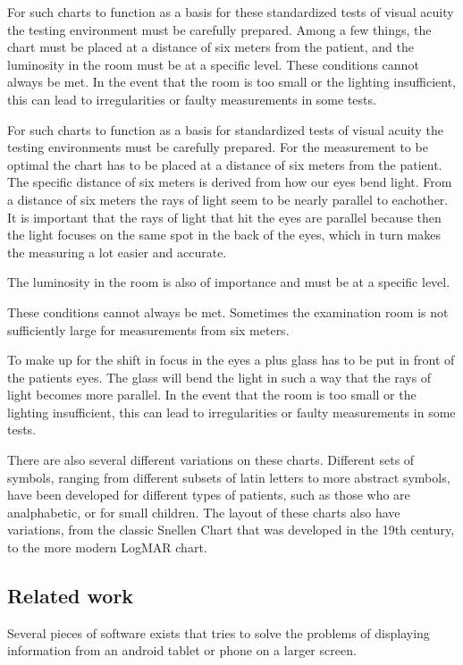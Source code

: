 \documentclass[12pt,a4paper,notitlepage]{report}
\begin{document}
For such charts to function as a basis for these standardized tests of visual acuity the testing environment must be carefully prepared. Among a few things, the chart must be placed at a distance of six meters from the patient, and the luminosity in the room must be at a specific level. These conditions cannot always be met. In the event that the room is too small or the lighting insufficient, this can lead to irregularities or faulty measurements in some tests. 

For such charts to function as a basis for standardized tests of visual acuity the testing environments must be carefully prepared. For the measurement to be optimal the chart has to be placed at a distance of six meters from the patient. The specific distance of six meters is derived from how our eyes bend light. From a distance of six meters the rays of light seem to be nearly parallel to eachother. %
It is important that the rays of light that hit the eyes are parallel because then the light focuses on the same spot in the back of the eyes, which in turn makes the measuring a lot easier and accurate.

The luminosity in the room is also of importance and must be at a specific level. 

These conditions cannot always be met. Sometimes the examination room is not sufficiently large for measurements from six meters. %

To make up for the shift in focus in the eyes a plus glass has to be put in front of the patients eyes. The glass will bend the light in such a way that the rays of light becomes more parallel. In the event that the room is too small or the lighting insufficient, this can lead to irregularities or faulty measurements in some tests. 

There are also several different variations on these charts. Different sets of symbols, ranging from different subsets of latin letters to more abstract symbols, have been developed for different types of patients, such as those who are analphabetic, or for small children. The layout of these charts also have variations, from the classic Snellen Chart that was developed in the 19th century, to the more modern LogMAR chart.

\subsection{Related work}
Several pieces of software exists that tries to solve the problems of displaying information from an android tablet or phone on a larger screen. 
\end{document}
